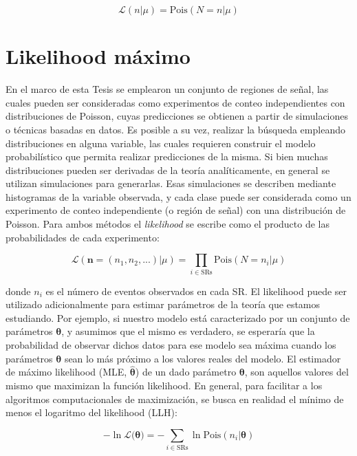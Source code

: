 \begin{equation}
	\mathcal{L}(n|\mu) = \text{Pois}(N=n|\mu) 
\end{equation}

\section{Likelihood máximo}

En el marco de esta Tesis se emplearon un conjunto de regiones de señal, las cuales pueden ser consideradas como experimentos de conteo independientes con distribuciones de Poisson, cuyas predicciones se obtienen a partir de simulaciones o técnicas basadas en datos. 
Es posible a su vez, realizar la búsqueda empleando distribuciones en alguna variable, las cuales requieren construir el modelo probabilístico que permita realizar predicciones de la misma. Si bien muchas distribuciones pueden ser derivadas de la teoría analíticamente, en general se utilizan simulaciones para generarlas. Esas simulaciones se describen mediante histogramas de la variable observada, y cada clase puede ser considerada como un experimento de conteo independiente (o región de señal) con una distribución de Poisson. 
Para ambos métodos el \textit{likelihood} se escribe como el producto de las probabilidades de cada experimento:


\begin{equation}
	\mathcal{L}(\textbf{n}=(n_1,n_2,...)|\mu) = \prod_{i\in \text{SRs}} \text{Pois}(N=n_i|\mu) 
\end{equation}


\noindent donde $n_i$ es el número de eventos observados en cada SR. 
El likelihood puede ser utilizado adicionalmente para estimar parámetros de la teoría que estamos estudiando. Por ejemplo, si nuestro modelo está caracterizado por un conjunto de parámetros $\bm{\theta}$, y asumimos que el mismo es verdadero, se esperaría que la probabilidad de observar dichos datos para ese modelo sea máxima cuando los parámetros $\bm{\theta}$ sean lo más próximo a los valores reales del modelo. El estimador de máximo likelihood (MLE, $\hat{\bm{\theta}}$) de un dado parámetro $\bm{\theta}$, son aquellos valores del mismo que maximizan la función likelihood. En general, para facilitar a los algoritmos computacionales de maximización, se busca en realidad el mínimo de menos el logaritmo del likelihood (LLH):

\begin{equation}
	-\ln{\mathcal{L}(\bm{\theta}}) = - \sum_{i\in \text{SRs}}\ln{\text{Pois}(n_i|\bm{\theta})}
\end{equation}

